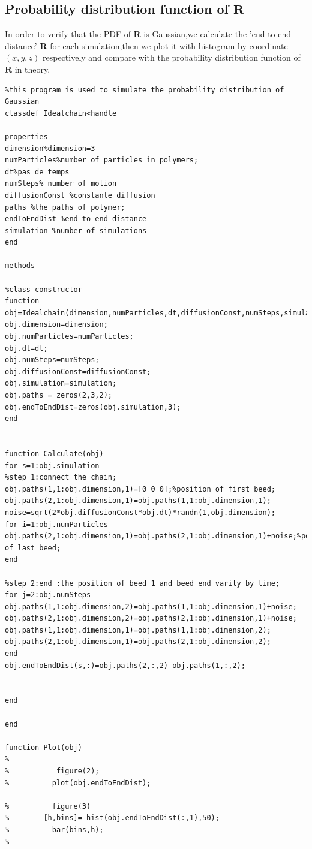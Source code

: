 \documentclass{article}
\begin{document}
\subsection{Probability distribution function of $\bm{R}$  }
In order to verify that the PDF of $\bm{R}$ is Gaussian,we calculate the 'end to end distance' $\bm{R}$ for each simulation,then we plot it with histogram by coordinate $(x,y,z)$ respectively and compare with the probability distribution function of $\bm{R}$ in theory. 
\begin{lstlisting}
%this program is used to simulate the probability distribution of Gaussian 
classdef Idealchain<handle

properties
dimension%dimension=3
numParticles%number of particles in polymers;
dt%pas de temps
numSteps% number of motion
diffusionConst %constante diffusion
paths %the paths of polymer;
endToEndDist %end to end distance 
simulation %number of simulations
end

methods

%class constructor
function obj=Idealchain(dimension,numParticles,dt,diffusionConst,numSteps,simulation)
obj.dimension=dimension;
obj.numParticles=numParticles;
obj.dt=dt;
obj.numSteps=numSteps;
obj.diffusionConst=diffusionConst;
obj.simulation=simulation;
obj.paths = zeros(2,3,2);
obj.endToEndDist=zeros(obj.simulation,3);
end


function Calculate(obj)
for s=1:obj.simulation 
%step 1:connect the chain;
obj.paths(1,1:obj.dimension,1)=[0 0 0];%position of first beed;
obj.paths(2,1:obj.dimension,1)=obj.paths(1,1:obj.dimension,1);
noise=sqrt(2*obj.diffusionConst*obj.dt)*randn(1,obj.dimension);
for i=1:obj.numParticles
obj.paths(2,1:obj.dimension,1)=obj.paths(2,1:obj.dimension,1)+noise;%position of last beed;
end

%step 2:end :the position of beed 1 and beed end varity by time;
for j=2:obj.numSteps
obj.paths(1,1:obj.dimension,2)=obj.paths(1,1:obj.dimension,1)+noise;
obj.paths(2,1:obj.dimension,2)=obj.paths(2,1:obj.dimension,1)+noise;   
obj.paths(1,1:obj.dimension,1)=obj.paths(1,1:obj.dimension,2);
obj.paths(2,1:obj.dimension,1)=obj.paths(2,1:obj.dimension,2);  
end
obj.endToEndDist(s,:)=obj.paths(2,:,2)-obj.paths(1,:,2);


end

end

function Plot(obj)
% 
%           figure(2);
%          plot(obj.endToEndDist);

%          figure(3)
%        [h,bins]= hist(obj.endToEndDist(:,1),50);
%          bar(bins,h);
%        


\end{lstlisting}
\end{document}
